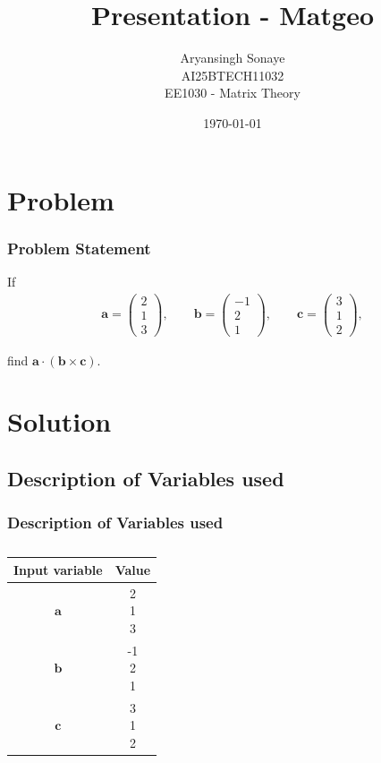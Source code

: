 \documentclass{beamer}
\title{Presentation - Matgeo}
\author{Aryansingh Sonaye \\
AI25BTECH11032 \\
EE1030 - Matrix Theory}
\date{\today}
\theoremstyle{remark}
\newcommand{\myvec}[1]{\ensuremath{\begin{pmatrix}#1\end{pmatrix}}}
\let\vec\mathbf
\numberwithin{equation}{section}
\begin{document}
\begin{frame}
\titlepage
\end{frame}

\section{Problem}
\begin{frame}
\frametitle{Problem Statement}
If
\begin{align}
\vec a = \myvec{2 \\1 \\3},\qquad
\vec b = \myvec{-1 \\2 \\1},\qquad
\vec c = \myvec{3 \\1 \\2},
\end{align}

find $\vec a\cdot(\vec b\times\vec c)$.
\end{frame}

\section{Solution}
\subsection{Description of Variables used}
\begin{frame}
\frametitle{Description of Variables used}
\begin{table}[H]
\centering
\begin{tabular}[12pt]{ |c| c|}
    \hline
    \textbf{Input variable} & \textbf{Value}\\ 
    \hline
    $\vec{a}$ & \myvec{2 \\1 \\3} \\
    \hline 
    $\vec{b}$ & \myvec{-1 \\2 \\1}\\
    \hline
    $\vec{c}$ & \myvec{3 \\1 \\2}\\
    \hline
    \end{tabular}
    \caption{}
    \label{}
 \end{table}


\end{frame}
\end{document}
